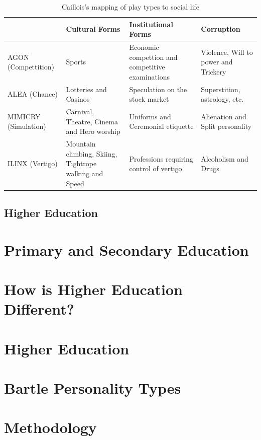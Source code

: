 \documentclass{article}
\begin{document}
\begin{table}
\begin{tabular}{|p{2.5cm}|p{4.1cm}|p{4.1cm}|p{4.1cm}|}
	\hline  & Cultural Forms & Institutional Forms & Corruption \\ 
	\hline AGON (Compettition) & Sports & Economic compettion and competitive examinations & Violence, Will to power and Trickery \\ 
	\hline ALEA (Chance) & Lotteries and Casinos & Speculation on the stock market & Superstition, astrology, etc. \\ 
	\hline MIMICRY (Simulation) & Carnival, Theatre, Cinema and Hero worship & Uniforms and Ceremonial etiquette & Alienation and Split personality \\ 
	\hline ILINX (Vertigo) & Mountain climbing, Skiing, Tightrope walking and Speed & Professions requiring control of vertigo & Alcoholism and Drugs \\ 
	\hline 
\end{tabular}
\caption{Caillois's mapping of play types to social life \cite{caillois1961man}}
\label{table:corruption}
\end{table}

\subsection{Higher Education}

\section{Primary and Secondary Education}

\section{How is Higher Education Different?}

\section{Higher Education}

\section{Bartle Personality Types}

\section{Methodology}
\end{document}

